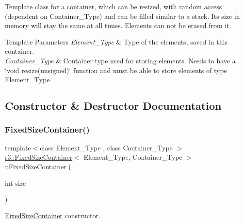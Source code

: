 Template class for a container, which can be resized, with random access (dependent on Container\+\_\+\+Type) and can be filled similar to a stack. Its size in memory will stay the same at all times. Elements can not be erased from it. 


\begin{DoxyTemplParams}{Template Parameters}
{\em Element\+\_\+\+Type} & Type of the elements, saved in this container. \\
\hline
{\em Container\+\_\+\+Type} & Container type used for storing elements. Needs to have a \char`\"{}void resize(unsigned)\char`\"{} function and must be able to store elements of type Element\+\_\+\+Type \\
\hline
\end{DoxyTemplParams}


\subsection{Constructor \& Destructor Documentation}
\mbox{\label{classr3_1_1_fixed_size_container_a9396266faf0a5d5d75ea50f0d74d5267}} 
\subsubsection{\texorpdfstring{Fixed\+Size\+Container()}{FixedSizeContainer()}}
{\footnotesize\ttfamily template$<$class Element\+\_\+\+Type , class Container\+\_\+\+Type $>$ \\
\mbox{\hyperlink{classr3_1_1_fixed_size_container}{r3\+::\+Fixed\+Size\+Container}}$<$ Element\+\_\+\+Type, Container\+\_\+\+Type $>$\+::\mbox{\hyperlink{classr3_1_1_fixed_size_container}{Fixed\+Size\+Container}} (\begin{DoxyParamCaption}\item[{int}]{size }\end{DoxyParamCaption})\hspace{0.3cm}{\ttfamily [explicit]}}



\mbox{\hyperlink{classr3_1_1_fixed_size_container}{Fixed\+Size\+Container}} constructor. 

\mbox{\label{classr3_1_1_fixed_size_container_af235a796be8de5a9e96c788b676b59fa}} 
